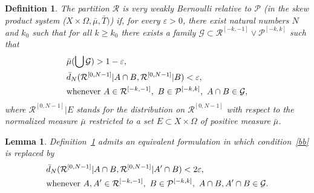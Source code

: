 \documentclass{amsart}
\newtheorem{lem}[thm]{Lemma}
\newtheorem{defn}[thm]{Definition}
\theoremstyle{remark}
\def \R {\mathcal R}
\def \G {\mathcal G}
\def \P {\mathcal P}
\def \eps {\varepsilon}
\begin{document}
\begin{defn}\label{VWB}
The partition $\R$ is very weakly Bernoulli relative to $\P$ (in the skew product system ($X\times\Omega,\bar\mu,\bar T)$) if, for every $\eps>0$, there exist natural numbers $N$ and $k_0$ such that for all $k\ge k_0$ there exists a family $\G\subset\R^{[-k,-1]}\vee\P^{[-k,k]}$ such that
\begin{align}
&\bar\mu(\bigcup\G)>1-\eps,\label{aa}\\
&\bar d_N(\R^{[0,N-1]}|A\cap B, \R^{[0,N-1]}|B)<\eps,\label{bb}\\ 
&\text{whenever }A\in\R^{[-k,-1]},\ B\in\P^{[-k,k]},\ A\cap B\in\G,\notag
\end{align}
where $\R^{[0,N-1]}|E$ stands for the distribution on $\R^{[0,N-1]}$ with respect to the normalized measure $\bar\mu$ restricted to a set $E\subset X\times\Omega$ of positive measure $\bar\mu$. 
\end{defn}

\begin{lem}\label{over}
Definition~\ref{VWB} admits an equivalent formulation in which condition~\eqref{bb} is replaced by
\begin{align}
&\bar d_N(\R^{[0,N-1]}|A\cap B, \R^{[0,N-1]}|A'\cap B)<2\eps,\label{bb1}\\ 
&\text{whenever }A,A'\in\R^{[-k,-1]},\ B\in\P^{[-k,k]},\ A\cap B,A'\cap B\in\G.\notag
\end{align}
\end{lem}
\end{document}
